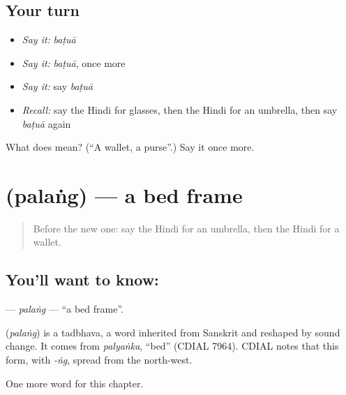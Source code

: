 \subsection*{Your turn}
\begin{itemize}
\raggedright
  \item \emph{Say it:} \emph{baṭuā}
  \item \emph{Say it:} \emph{baṭuā}, once more
  \item \emph{Say it:} say \emph{baṭuā}
  \item \emph{Recall:} say the Hindi for glasses, then the Hindi for an umbrella, then say \emph{baṭuā} again
\end{itemize}

\begin{tcolorbox}[breakable,colback=teal!4,colframe=teal!35!black,title={Before you move on}]
What does  mean? (\textquotedblleft{}A wallet, a purse\textquotedblright{}.) Say it once more.
\end{tcolorbox}
\section[\texorpdfstring{\hi{पलंग} (palaṅg)}{पलंग (palaṅg)}]{ (palaṅg) — a bed frame}

\label{lesson:HI-C133-palang}



\begin{quote}
Before the new one: say the Hindi for an umbrella, then the Hindi for a wallet.
\end{quote}

\subsection*{You'll want to know: }
\textbf{} — \emph{palaṅg} — \textquotedblleft{}a bed frame\textquotedblright{}.

\begin{cousinweb}
\textbf{} (\emph{palaṅg}) is a tadbhava, a word inherited from Sanskrit and reshaped by sound change. It comes from \emph{palyaṅka}, \textquotedblleft{}bed\textquotedblright{} (CDIAL 7964). CDIAL notes that this form, with \emph{-ṅg}, spread from the north-west.
\end{cousinweb}

\begin{grammarlens}[title={What you've built}]
One more word for this chapter.
\end{grammarlens}

